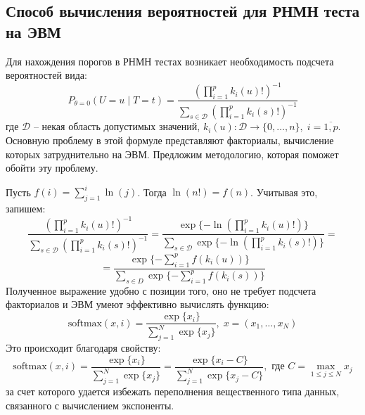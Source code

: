 \subsection{Способ вычисления вероятностей для РНМН теста
на ЭВМ}

Для нахождения порогов в РНМН тестах возникает необходимость
подсчета вероятностей вида:
$$P_{\theta=0}(U=u \mid T=t)=\dfrac{(\prod_{i=1}^p k_i(u)!)^{-1}}
            {\sum_{s\in \mathcal{D}} (\prod_{i=1}^p k_i(s)!)^{-1}}$$
где $\mathcal{D}$ -- некая область допустимых значений,
$k_i(u):\mathcal{D} \to \{0,\ldots,n\}, \; i=\overline{1,p}$.
Основную проблему в этой формуле представляют 
факториалы, вычисление которых затруднительно на ЭВМ. 
Предложим методологию, которая поможет обойти эту проблему.

    Пусть $f(i)=\sum_{j=1}^{i} \ln(j)$. Тогда $\ln(n!)=f(n)$.
    Учитывая это, запишем:
    $$
    \dfrac{(\prod_{i=1}^p k_i(u)!)^{-1}}
            {\sum_{s\in \mathcal{D}} (\prod_{i=1}^p k_i(s)!)^{-1}}=
    \dfrac{\exp\{-\ln(\prod_{i=1}^p k_i(u)!)\}}
    {\sum_{s\in \mathcal{D}} \exp \{-\ln(\prod_{i=1}^p k_i(s)!)\}}=
    $$
    $$
    = \dfrac{\exp \{ -\sum_{i=1}^p f(k_i(u)) \}}
    {\sum_{s \in D} \exp \{ -\sum_{i=1}^p f(k_i(s)) \}}
    $$
Полученное выражение удобно с позиции того, оно не требует подсчета факториалов и ЭВМ умеют 
эффективно вычислять функцию:
$$
\text{softmax}(x,i)=\dfrac{\exp\{x_i\}}{\sum_{j=1}^{N} \exp\{x_j\}}, \; x=(x_1,\ldots,x_N)
$$
Это происходит благодаря свойству:
$$
\text{softmax}(x,i)=\dfrac{\exp\{x_i\}}{\sum_{j=1}^{N} \exp\{x_j\}} = \dfrac{\exp\{x_i - C\}}{\sum_{j=1}^{N} \exp\{x_j - C\}}
, \text{ где } C=\max_{1\leq j \leq N} x_j
$$
за счет которого удается избежать переполнения вещественного типа данных, 
связанного с вычислением экспоненты.
